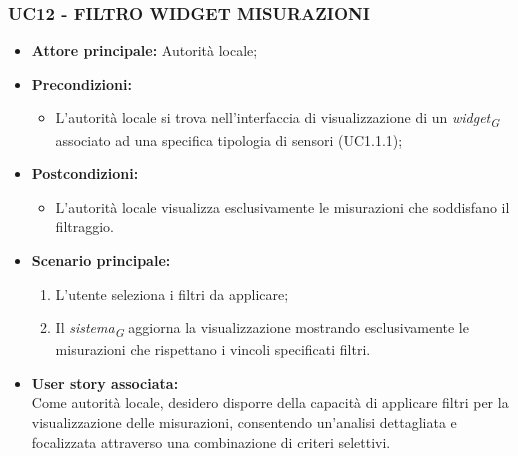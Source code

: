 \subsubsection{UC12 - FILTRO WIDGET MISURAZIONI}
\begin{itemize}
    \item \textbf{Attore principale:} Autorità locale;
    \item \textbf{Precondizioni:}
        \begin{itemize}
            \item L'autorità locale si trova nell'interfaccia di visualizzazione di un \textit{widget}\textsubscript{\textit{G}} associato ad una specifica tipologia di sensori (UC1.1.1);
        \end{itemize}
    \item \textbf{Postcondizioni:}
          \begin{itemize}
              \item L'autorità locale visualizza esclusivamente le misurazioni che soddisfano il filtraggio.
          \end{itemize}
    \item \textbf{Scenario principale:}
          \begin{enumerate}
              \item L'utente seleziona i filtri da applicare;
              \item Il \textit{sistema}\textsubscript{\textit{G}} aggiorna la visualizzazione mostrando esclusivamente le misurazioni che rispettano i vincoli specificati filtri.
          \end{enumerate}
    \item \textbf{User story associata:} \\
        Come autorità locale, desidero disporre della capacità di applicare filtri per la visualizzazione delle misurazioni, consentendo un'analisi dettagliata e focalizzata attraverso una combinazione di criteri selettivi.
\end{itemize}
